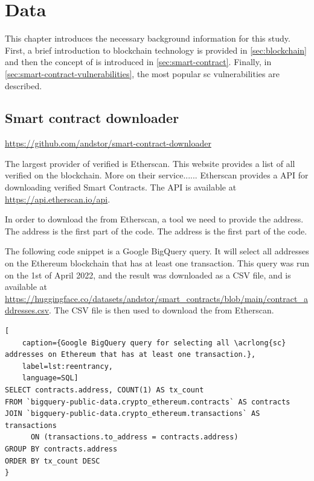 \chapter{Data}
\label{chap:datasets}
This chapter introduces the necessary background information for this study. First, a brief introduction to blockchain technology is provided in \cref{sec:blockchain} and then the concept of  is introduced in \cref{sec:smart-contract}. Finally, in \cref{sec:smart-contract-vulnerabilities}, the most popular \acrshort{sc} vulnerabilities are described.

\section{Smart contract downloader}
\label{sec:smart-contract-downloader}
\url{https://github.com/andstor/smart-contract-downloader}


The largest provider of verified  is Etherscan. This website provides a list of all verified  on the blockchain. More on their service...... Etherscan provides a API for downloading verified Smart Contracts. The API is available at \url{https://api.etherscan.io/api}.

In order to download the  from Etherscan, a tool we need to provide the  address. The address is the first part of the  code. The address is the first part of the  code.

The following code snippet is a Google BigQuery query. It will select all  addresses on the Ethereum blockchain that has at least one transaction. This query was run on the 1st of April 2022, and the result was downloaded as a CSV file, and is available at \url{https://huggingface.co/datasets/andstor/smart_contracts/blob/main/contract_addresses.csv}. The CSV file is then used to download the  from Etherscan.

\begin{lstlisting}[
    caption={Google BigQuery query for selecting all \acrlong{sc} addresses on Ethereum that has at least one transaction.},
    label=lst:reentrancy,
    language=SQL]
SELECT contracts.address, COUNT(1) AS tx_count
FROM `bigquery-public-data.crypto_ethereum.contracts` AS contracts
JOIN `bigquery-public-data.crypto_ethereum.transactions` AS transactions 
      ON (transactions.to_address = contracts.address)
GROUP BY contracts.address
ORDER BY tx_count DESC
}
\end{lstlisting}

